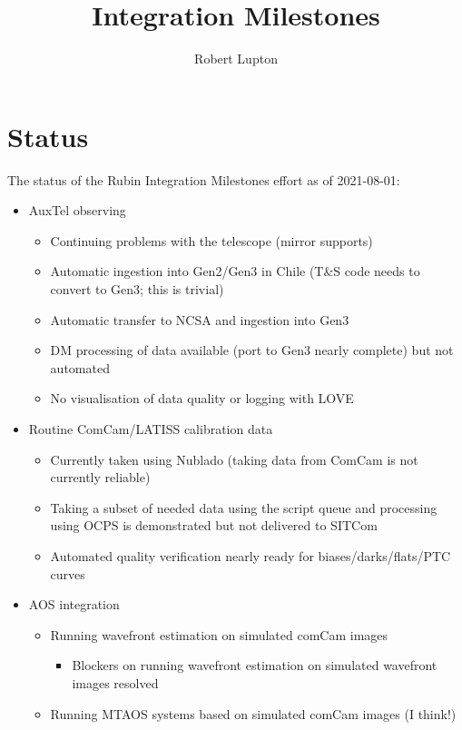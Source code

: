 \documentclass[SE,authoryear,toc]{lsstdoc}
\title{Integration Milestones}
\author{%
Robert Lupton
}
\date{\vcsDate}
\begin{document}
\maketitle

\section{Status}

The status of the Rubin Integration Milestones effort as of 2021-08-01:
\begin{itemize}
\item AuxTel observing
  \begin{itemize}
  \item Continuing problems with the telescope (\eg mirror supports)
  \item Automatic ingestion into Gen2/Gen3 in Chile (T\&S code needs to convert to Gen3; this is trivial)
  \item Automatic transfer to NCSA and ingestion into Gen3
  \item DM processing of data available (port to Gen3 nearly complete) but not automated
  \item No visualisation of data quality or logging with LOVE
  \end{itemize}
  
\item Routine ComCam/LATISS calibration data
  \begin{itemize}
  \item Currently taken using Nublado (\nb taking data from ComCam is not currently reliable)
  \item Taking a subset of needed data using the script queue and processing using OCPS is demonstrated
    but not delivered to SITCom
  \item Automated quality verification nearly ready for biases/darks/flats/PTC curves
  \end{itemize}

\item AOS integration
  \begin{itemize}
  \item Running wavefront estimation on simulated comCam images
    \begin{itemize}
    \item Blockers on running wavefront estimation on simulated wavefront images resolved
    \end{itemize}
  \item Running MTAOS systems based on simulated comCam images (I think!)
  \end{itemize}

\end{itemize}
\end{document}
